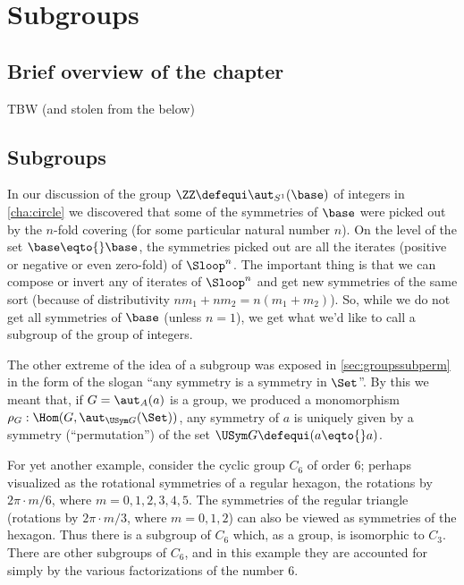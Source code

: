 \chapter{Subgroups}
\label{ch:subgroups}


\section{Brief overview of the chapter}
\label{sec:subgp-overview}

TBW (and stolen from the below)

\section{Subgroups}
\label{sec:subgroups}
In our discussion of the group $\ZZ\defequi\aut_{S^1}(\base)$ of integers in \cref{cha:circle} we discovered that some of the symmetries of $\base$ were picked out by the $n$-fold covering (for some particular natural number $n$).  On the level of the set $\base\eqto{}\base$, the symmetries picked out are all the iterates (positive or negative or even zero-fold) of $\Sloop^n$.  The important thing is that we can compose or invert any of iterates of $\Sloop^n$ and get new symmetries of the same sort (because of distributivity $nm_1+nm_2=n(m_1+m_2)$).  So, while we do not get all symmetries of $\base$ (unless $n=1$), we get what we'd like to call a subgroup of the group of integers. 



The other extreme of the idea of a subgroup was exposed in \cref{sec:groupssubperm} in the form of the slogan ``any symmetry is a symmetry in $\Set$''.
By this we meant that, if $G=\aut_A(a)$ is a group, we produced a monomorphism $\rho_G:\Hom(G,\aut_{\USym G}(\Set))$, \ie any symmetry of $a$ is uniquely given by a symmetry (``permutation'') of the set $\USym G\defequi (a\eqto{}a)$.

For yet another example, consider the cyclic group $C_6$ of order $6$; perhaps visualized as the rotational symmetries of a regular hexagon,  \ie the rotations by $2\pi\cdot m /6$, where $m=0,1,2,3,4,5$.
The symmetries of the regular triangle (rotations by $2\pi\cdot m/3$, where $m=0,1,2$) can also be viewed as symmetries of the hexagon.  Thus there is a subgroup of $C_6$ which, as a group, is isomorphic to $C_3$.
There are other subgroups of $C_6$, and in this example they are accounted for simply by the various factorizations of the number $6$.  

